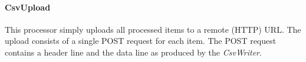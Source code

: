 \paragraph{CsvUpload}

This processor simply uploads all processed items to a remote (HTTP)
URL. The upload consists of a single POST request for each item. The
POST request contains a header line and the data line as produced by the
\emph{CsvWriter}.

